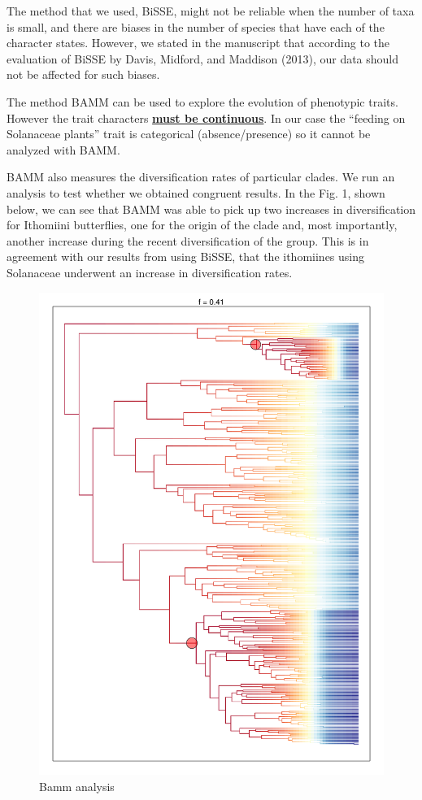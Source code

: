 \documentclass[]{article}
\begin{document}
The method that we used, BiSSE, might not be reliable when the number of
taxa is small, and there are biases in the number of species that have
each of the character states. However, we stated in the manuscript that
according to the evaluation of BiSSE by Davis, Midford, and Maddison
(2013), our data should not be affected for such biases.

The method BAMM can be used to explore the evolution of phenotypic
traits. However the trait characters
\href{http://bamm-project.org/configuration.html\#id5}{\textbf{must be
continuous}}. In our case the ``feeding on Solanaceae plants'' trait is
categorical (absence/presence) so it cannot be analyzed with BAMM.

BAMM also measures the diversification rates of particular clades. We
run an analysis to test whether we obtained congruent results. In the
Fig. 1, shown below, we can see that BAMM was able to pick up two
increases in diversification for Ithomiini butterflies, one for the
origin of the clade and, most importantly, another increase during the
recent diversification of the group. This is in agreement with our
results from using BiSSE, that the ithomiines using Solanaceae underwent
an increase in diversification rates.

\begin{figure}[htbp]
\centering
\includegraphics{response_to_reviewers_fig1.pdf}
\caption{Bamm analysis}
\end{figure}
\end{document}
